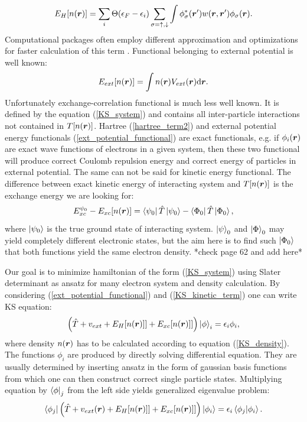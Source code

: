 \documentclass[openany, longbibliography,slovene,a4paper,12pt]{article}
\def\vec#1{\mbox{\boldmath$#1$}}
\newcommand{\dif}{\mathrm{d}}
\begin{document}
\begin{equation} \label{hartree_term2}
   E_H[n(\vec r)] =  \sum_i\Theta(\epsilon_F-\epsilon_i)  \sum_{\sigma=\uparrow,\downarrow}\int \phi^*_\sigma(\vec r')w(\vec r, \vec r')\phi_\sigma(\vec r).
  \end{equation}
Computational packages often employ different approximation and optimizations
for faster calculation of this term \cite{orca}. Functional belonging to
external potential is well known:
\begin{equation} \label{ext_potential_functional}
  E_{ext}[n(\vec r)] = \int n(\vec r) V_{ext}(\vec r) \dif \vec r.
\end{equation}
Unfortunately exchange-correlation functional is much less well known. It is
defined by the equation (\ref{KS_system}) and contains all inter-particle
interactions not contained in $T[n(\vec r)]$. Hartree (\ref{hartree_term2}) and external potential
energy functionals (\ref{ext_potential_functional}) are exact functionals, e.g.
if $\phi_i(\vec r)$ are exact wave functions of electrons in a given system,
then these two functional will produce correct Coulomb repulsion energy and
correct energy of particles in external potential.  The same can not be said for
kinetic energy functional. The difference between exact kinetic energy
of interacting system and $T[n(\vec r)]$ is the exchange energy we are looking for:
\begin{equation}
  E_{xc}^{\psi_0}-E_{xc}[n(\vec r)] = \bra{\psi_0}\hat T \ket{\psi_0} - \bra{\Phi_0}\hat T \ket{\Phi_0},
\end{equation}
where $\ket{\psi_0}$ is the true ground state of interacting system. $\ket
\psi_0$ and $\ket \Phi_0$ may yield completely different electronic states,
but the aim here is to find such $\ket{\Phi_0}$ that both functions yield the
same electron density. *check page 62 and add here*

Our goal is to minimize hamiltonian of the form (\ref{KS_system}) using Slater
determinant as ansatz for many electron system and density calculation. By
considering (\ref{ext_potential_functional}) and (\ref{KS_kinetic_term}) one can
write KS equation:  
\begin{equation}
  \left( \hat T + v_{ext} + E_H[n(\vec r)]]  + E_{xc}[n(\vec r)]] \right) \ket \phi_i =  \epsilon_i \phi_i,  
\end {equation}
where density $n(\vec r)$  has to be calculated according to equation
(\ref{KS_density}). The functions $\phi_i$ are produced by directly solving
differential equation. They are usually determined by inserting ansatz in the
form of gaussian basis functions from which one can
then construct correct single particle states. Multiplying equation by $\bra
\phi_j$ from the left side yields generalized eigenvalue problem:
\begin{equation}
  \bra {\phi_j} \left( \hat T + v_{ext}(\vec r) + E_H[n(\vec r)]]  + E_{xc}[n(\vec r)]] \right) \ket{\phi_i} =  \epsilon_i \braket{ \phi_j |\phi_i }.
\end {equation}
\end{document}
